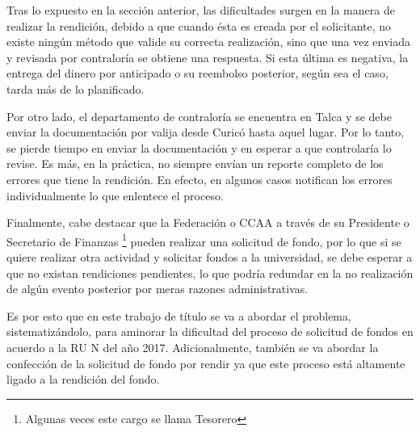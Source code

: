 Tras lo expuesto en la sección anterior, las dificultades surgen en la manera de realizar la rendición, debido a que cuando ésta es creada por el solicitante, no existe ningún método que valide su correcta realización, sino que una vez enviada y revisada por contraloría se obtiene una respuesta. Si esta última es negativa, la entrega del dinero por anticipado o su reembolso posterior, según sea el caso, tarda más de lo planificado.

Por otro lado, el departamento de contraloría se encuentra en Talca y se debe enviar la documentación por valija desde Curicó hasta aquel lugar. Por lo tanto, se pierde tiempo en enviar la documentación y en esperar a que controlaría lo revise. Es más, en la práctica, no siempre envían un reporte completo de los errores que tiene la rendición. En efecto, en algunos casos notifican los errores individualmente lo que enlentece el proceso.

Finalmente, cabe destacar que la Federación o CCAA a través de su Presidente o Secretario de Finanzas \footnote{Algunas veces este cargo se llama Tesorero} pueden realizar una solicitud de fondo, por lo que si se quiere realizar otra actividad y solicitar fondos a la universidad, se debe esperar a que no existan rendiciones pendientes, lo que podría redundar en la no realización de algún evento posterior por meras razones administrativas.

Es por esto que en este trabajo de título se va a abordar el problema, sistematizándolo, para aminorar la dificultad del proceso de solicitud de fondos en acuerdo a la RU N del año 2017. Adicionalmente, también se va abordar la confección de la solicitud de fondo por rendir ya que este proceso está altamente ligado a la rendición del fondo.
